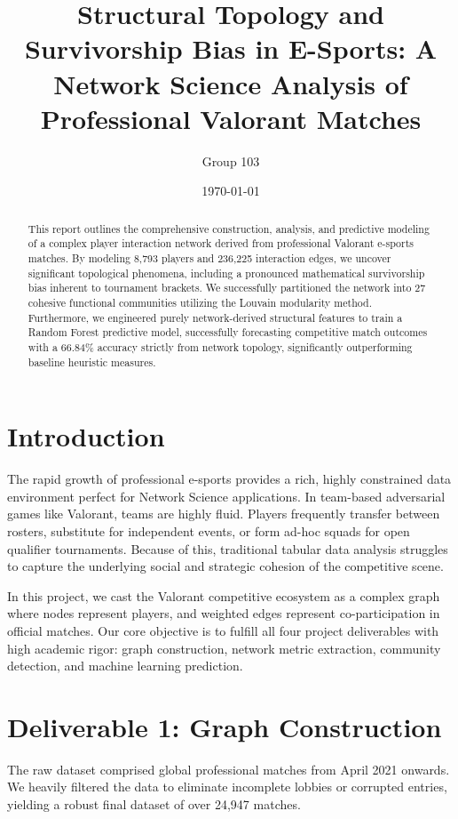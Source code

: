 \documentclass[12pt, a4paper]{article}
\title{\textbf{Structural Topology and Survivorship Bias in E-Sports: A Network Science Analysis of Professional Valorant Matches}}
\author{Group 103}
\date{\today}
\begin{document}
\maketitle

\begin{abstract}
This report outlines the comprehensive construction, analysis, and predictive modeling of a complex player interaction network derived from professional Valorant e-sports matches. By modeling 8,793 players and 236,225 interaction edges, we uncover significant topological phenomena, including a pronounced mathematical survivorship bias inherent to tournament brackets. We successfully partitioned the network into 27 cohesive functional communities utilizing the Louvain modularity method. Furthermore, we engineered purely network-derived structural features to train a Random Forest predictive model, successfully forecasting competitive match outcomes with a 66.84\% accuracy strictly from network topology, significantly outperforming baseline heuristic measures.
\end{abstract}

\section{Introduction}
The rapid growth of professional e-sports provides a rich, highly constrained data environment perfect for Network Science applications. In team-based adversarial games like Valorant, teams are highly fluid. Players frequently transfer between rosters, substitute for independent events, or form ad-hoc squads for open qualifier tournaments. Because of this, traditional tabular data analysis struggles to capture the underlying social and strategic cohesion of the competitive scene. 

In this project, we cast the Valorant competitive ecosystem as a complex graph where nodes represent players, and weighted edges represent co-participation in official matches. Our core objective is to fulfill all four project deliverables with high academic rigor: graph construction, network metric extraction, community detection, and machine learning prediction.

\section{Deliverable 1: Graph Construction}
The raw dataset comprised global professional matches from April 2021 onwards. We heavily filtered the data to eliminate incomplete lobbies or corrupted entries, yielding a robust final dataset of over 24,947 matches. 
\end{document}
